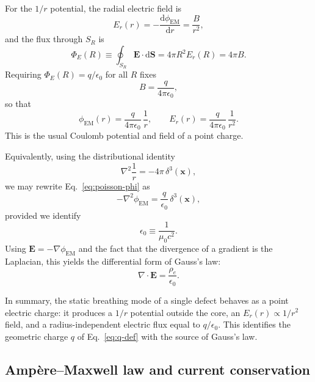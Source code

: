 \documentclass[11pt]{article}
\newcommand{\dd}{\mathrm{d}}
\begin{document}
For the $1/r$ potential, the radial electric field is
\begin{equation}
E_r(r) = -\frac{\dd \phi_{\mathrm{EM}}}{\dd r}
= \frac{B}{r^2},
\end{equation}
and the flux through $S_R$ is
\begin{equation}
\Phi_E(R) \equiv \oint_{S_R} \mathbf{E}\cdot\dd\mathbf{S}
= 4\pi R^2 E_r(R)
= 4\pi B.
\end{equation}
Requiring $\Phi_E(R) = q/\epsilon_0$ for all $R$ fixes
\begin{equation}
B = \frac{q}{4\pi\epsilon_0},
\end{equation}
so that
\begin{equation}
\phi_{\mathrm{EM}}(r)
= \frac{q}{4\pi\epsilon_0}\,\frac{1}{r},
\qquad
E_r(r)
= \frac{q}{4\pi\epsilon_0}\,\frac{1}{r^2}.
\end{equation}
This is the usual Coulomb potential and field of a point charge.

Equivalently, using the distributional identity
\begin{equation}
\nabla^2 \frac{1}{r} = -4\pi\,\delta^3(\mathbf{x}),
\end{equation}
we may rewrite Eq.~\eqref{eq:poisson-phi} as
\begin{equation}
-\nabla^2 \phi_{\mathrm{EM}}
= \frac{q}{\epsilon_0}\,\delta^3(\mathbf{x}),
\end{equation}
provided we identify
\begin{equation}
\epsilon_0 \equiv \frac{1}{\mu_0 c^2}.
\end{equation}
Using $\mathbf{E} = -\nabla \phi_{\mathrm{EM}}$ and the fact that the divergence of a gradient is the Laplacian, this yields the differential form of Gauss's law:
\begin{equation}
\nabla \cdot \mathbf{E} = \frac{\rho_e}{\epsilon_0}.
\label{eq:gauss-differential}
\end{equation}

In summary, the static breathing mode of a single defect behaves as a point electric charge: it produces a $1/r$ potential outside the core, an $E_r(r)\propto 1/r^2$ field, and a radius-independent electric flux equal to $q/\epsilon_0$.  This identifies the geometric charge $q$ of Eq.~\eqref{eq:q-def} with the source of Gauss's law.

\subsection{Amp\`ere--Maxwell law and current conservation}
\label{subsec:ampere-continuity}
\end{document}
